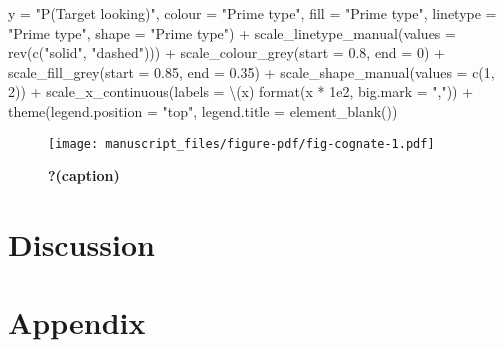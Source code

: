 \documentclass[
  letterpaper,
  DIV=11,
  numbers=noendperiod]{scrartcl}
\newenvironment{Shaded}{\begin{snugshade}}{\end{snugshade}}
\newcommand{\AttributeTok}[1]{\textcolor[rgb]{0.40,0.45,0.13}{#1}}
\newcommand{\DecValTok}[1]{\textcolor[rgb]{0.68,0.00,0.00}{#1}}
\newcommand{\FloatTok}[1]{\textcolor[rgb]{0.68,0.00,0.00}{#1}}
\newcommand{\FunctionTok}[1]{\textcolor[rgb]{0.28,0.35,0.67}{#1}}
\newcommand{\NormalTok}[1]{\textcolor[rgb]{0.00,0.23,0.31}{#1}}
\newcommand{\SpecialCharTok}[1]{\textcolor[rgb]{0.37,0.37,0.37}{#1}}
\newcommand{\StringTok}[1]{\textcolor[rgb]{0.13,0.47,0.30}{#1}}
\begin{document}
\begin{Shaded}
\begin{Highlighting}[]
         \AttributeTok{y =} \StringTok{"P(Target looking)"}\NormalTok{,}
         \AttributeTok{colour =} \StringTok{"Prime type"}\NormalTok{,}
         \AttributeTok{fill =} \StringTok{"Prime type"}\NormalTok{,}
         \AttributeTok{linetype =} \StringTok{"Prime type"}\NormalTok{,}
         \AttributeTok{shape =} \StringTok{"Prime type"}\NormalTok{) }\SpecialCharTok{+}
    \FunctionTok{scale\_linetype\_manual}\NormalTok{(}\AttributeTok{values =} \FunctionTok{rev}\NormalTok{(}\FunctionTok{c}\NormalTok{(}\StringTok{"solid"}\NormalTok{, }\StringTok{"dashed"}\NormalTok{))) }\SpecialCharTok{+}
    \FunctionTok{scale\_colour\_grey}\NormalTok{(}\AttributeTok{start =} \FloatTok{0.8}\NormalTok{, }\AttributeTok{end =} \DecValTok{0}\NormalTok{) }\SpecialCharTok{+}
    \FunctionTok{scale\_fill\_grey}\NormalTok{(}\AttributeTok{start =} \FloatTok{0.85}\NormalTok{, }\AttributeTok{end =} \FloatTok{0.35}\NormalTok{) }\SpecialCharTok{+}
    \FunctionTok{scale\_shape\_manual}\NormalTok{(}\AttributeTok{values =} \FunctionTok{c}\NormalTok{(}\DecValTok{1}\NormalTok{, }\DecValTok{2}\NormalTok{)) }\SpecialCharTok{+}
    \FunctionTok{scale\_x\_continuous}\NormalTok{(}\AttributeTok{labels =}\NormalTok{ \textbackslash{}(x) }\FunctionTok{format}\NormalTok{(x }\SpecialCharTok{*} \FloatTok{1e2}\NormalTok{, }\AttributeTok{big.mark =} \StringTok{","}\NormalTok{)) }\SpecialCharTok{+}
    \FunctionTok{theme}\NormalTok{(}\AttributeTok{legend.position =} \StringTok{"top"}\NormalTok{,}
          \AttributeTok{legend.title =} \FunctionTok{element\_blank}\NormalTok{())}
\end{Highlighting}
\end{Shaded}

\begin{figure}[H]

{\centering \texttt{[image: manuscript\_files/figure-pdf/fig-cognate-1.pdf]}

}

\caption{\label{fig-cognate}\textbf{?(caption)}}

\end{figure}

\hypertarget{discussion}{%
\section{Discussion}\label{discussion}}

\hypertarget{appendix}{%
\section{Appendix}\label{appendix}}
\end{document}
